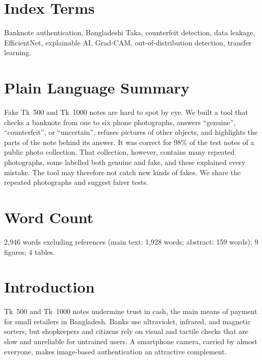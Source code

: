 \documentclass[journal,onecolumn]{IEEEtran}
\begin{document}
\section*{Index Terms}
Banknote authentication, Bangladeshi Taka, counterfeit detection, data leakage,
EfficientNet, explainable AI, Grad-CAM, out-of-distribution detection, transfer learning.

\section*{Plain Language Summary}
Fake Tk~500 and Tk~1000 notes are hard to spot by eye. We built a tool that checks a
banknote from one to six phone photographs, answers ``genuine'', ``counterfeit'', or
``uncertain'', refuses pictures of other objects, and highlights the parts of the note
behind its answer. It was correct for 98\% of the test notes of a public photo
collection. That collection, however, contains many repeated photographs, some labelled
both genuine and fake, and these explained every mistake. The tool may therefore not
catch new kinds of fakes. We share the repeated photographs and suggest fairer tests.

\section*{Word Count}
2{,}946 words excluding references (main text: 1{,}928 words; abstract: 159 words);
9 figures; 4 tables.

\section{Introduction}
\label{sec:intro}

 Tk~500 and Tk~1000 notes undermine trust in cash, the main
means of payment for small retailers in Bangladesh. Banks use ultraviolet, infrared, and
magnetic sorters, but shopkeepers and citizens rely on visual and tactile checks that are
slow and unreliable for untrained users. A smartphone camera, carried by almost
everyone, makes image-based authentication an attractive complement.
\end{document}
